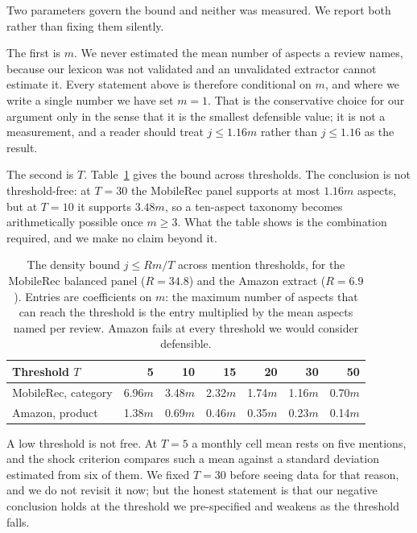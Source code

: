 \documentclass[11pt,a4paper]{article}
\begin{document}
Two parameters govern the bound and neither was measured. We report both
rather than fixing them silently.

The first is $m$. We never estimated the mean number of aspects a review names,
because our lexicon was not validated and an unvalidated extractor cannot
estimate it. Every statement above is therefore conditional on $m$, and where
we write a single number we have set $m = 1$. That is the conservative choice
for our argument only in the sense that it is the smallest defensible value; it
is not a measurement, and a reader should treat $j \leq 1.16m$ rather than
$j \leq 1.16$ as the result.

The second is $T$. Table~\ref{tab:threshold} gives the bound across thresholds.
The conclusion is not threshold-free: at $T = 30$ the MobileRec panel supports
at most $1.16m$ aspects, but at $T = 10$ it supports $3.48m$, so a ten-aspect
taxonomy becomes arithmetically possible once $m \geq 3$. What the table shows
is the combination required, and we make no claim beyond it.

\begin{table}[htbp]
\centering
\caption{The density bound $j \leq Rm/T$ across mention thresholds, for the
MobileRec balanced panel ($R = 34.8$) and the Amazon extract ($R = 6.9$).
Entries are coefficients on $m$: the maximum number of aspects that can reach
the threshold is the entry multiplied by the mean aspects named per review.
Amazon fails at every threshold we would consider defensible.}
\label{tab:threshold}
\small
\begin{tabular}{@{}lrrrrrr@{}}
\toprule
\textbf{Threshold $T$} & 5 & 10 & 15 & 20 & 30 & 50 \\
\midrule
MobileRec, category & 6.96$m$ & 3.48$m$ & 2.32$m$ & 1.74$m$ & 1.16$m$ & 0.70$m$ \\
Amazon, product     & 1.38$m$ & 0.69$m$ & 0.46$m$ & 0.35$m$ & 0.23$m$ & 0.14$m$ \\
\bottomrule
\end{tabular}
\end{table}

A low threshold is not free. At $T = 5$ a monthly cell mean rests on five
mentions, and the shock criterion compares such a mean against a standard
deviation estimated from six of them. We fixed $T = 30$ before seeing data for
that reason, and we do not revisit it now; but the honest statement is that our
negative conclusion holds at the threshold we pre-specified and weakens as the
threshold falls.
\end{document}
